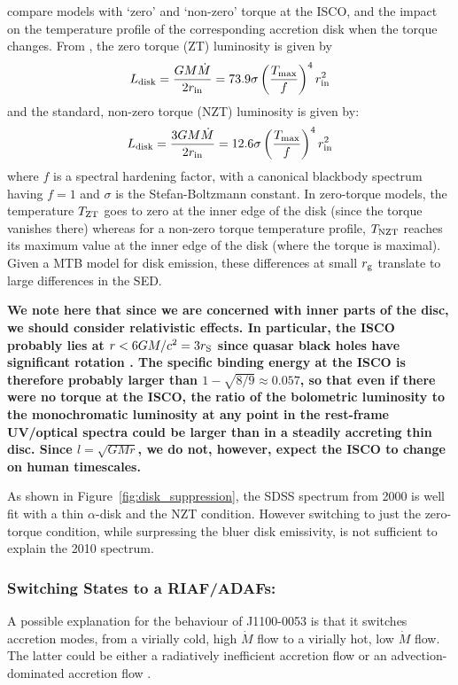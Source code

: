 \documentclass[a4paper,fleqn,usenatbib]{mnras}
\begin{document}
\citet{Zimmerman2005} compare models with `zero' and `non-zero' torque
at the ISCO, and the impact on the temperature profile of the
corresponding accretion disk when the torque changes.  From
\citet{Zimmerman2005}, the zero torque (ZT) luminosity is given by
\begin{equation}
L_{\rm disk}   =  \frac{G M \dot{M}}  {2 r_{\rm in}}    = 73.9 \sigma\left ( \frac{T_{\rm max}}{f}  \right )^{4}  r^{2}_{\rm in} 
\end{equation}
and the standard, non-zero torque (NZT) luminosity is given by:
\begin{equation}
L_{\rm disk} = \frac{3 G M \dot{M}}  {2 r_{\rm in}}    = 12.6 \sigma\left ( \frac{T_{\rm max}}{f}  \right )^{4}  r^{2}_{\rm in} 
\end{equation} 
where $f$ is a spectral hardening factor, with a canonical blackbody
spectrum having $f=1$ and $\sigma$ is the Stefan-Boltzmann constant.
In zero-torque models, the temperature $T_{\rm ZT}$ goes to zero at
the inner edge of the disk (since the torque vanishes there) whereas
for a non-zero torque temperature profile, $T_{\rm NZT}$ reaches its
maximum value at the inner edge of the disk (where the torque is
maximal). Given a MTB model for disk emission, these differences at
small $r_{\rm g}$ translate to large differences in the SED.

{\bf 
We note here that since we are concerned with inner parts of the disc,
we should consider relativistic effects. In particular, the ISCO
probably lies at $r < 6GM/c^{2} = 3r_{\rm S}$ since quasar black holes
have significant rotation \citep[e.g., ][]{Reynolds2014,
Capellupo2016}. The specific binding energy at the ISCO is therefore
probably larger than $1 - \sqrt{8/9} \approx 0.057$, so that even if
there were no torque at the ISCO, the ratio of the bolometric
luminosity to the monochromatic luminosity at any point in the
rest-frame UV/optical spectra could be larger than in a steadily
accreting thin disc. Since $l = \sqrt{GMr}$, we do not, however, expect 
the ISCO to change on human timescales.
}
 
As shown in Figure~\ref{fig:disk_suppression}, the SDSS spectrum from
2000 is well fit with a thin \citet{SS73} $\alpha$-disk and the NZT
condition.  However switching to just the zero-torque condition, while
surpressing the bluer disk emissivity, is not sufficient to explain
the 2010 spectrum.

\subsubsection{Switching States to a RIAF/ADAFs:}
A possible explanation for the behaviour of J1100-0053 is that it
switches accretion modes, from a virially cold, high $\dot{M}$ flow to
a virially hot, low $\dot{M}$ flow. The latter could be either a
radiatively inefficient accretion flow \citep[RIAF; ][]{Narayan1998,
Quataert2001} or an advection-dominated accretion flow \citep[ADAF;
][and references therein]{YuanNarayan2014}.
\end{document}
